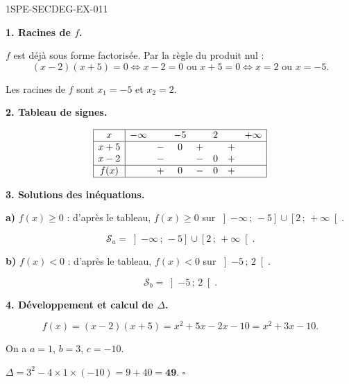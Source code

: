 \begin{corrige}{1SPE-SECDEG-EX-011}

\textbf{1. Racines de $f$.}


$f$ est déjà sous forme factorisée. Par la règle du produit nul :
\[(x-2)(x+5) = 0 \iff x - 2 = 0 \text{ ou } x + 5 = 0 \iff x = 2 \text{ ou } x = -5.\]

Les racines de $f$ sont $x_1 = -5$ et $x_2 = 2$.

\medskip
\textbf{2. Tableau de signes.}


\[
\begin{array}{|c|ccccccc|}
\hline
x & -\infty & & -5 & & 2 & & +\infty \\
\hline
x+5 & & - & 0 & + & & + & \\
x-2 & & - & & - & 0 & + & \\
\hline
f(x) & & + & 0 & - & 0 & + & \\
\hline
\end{array}
\]

\medskip
\textbf{3. Solutions des inéquations.}

\textbf{a)} $f(x) \geqslant 0$ : d'après le tableau, $f(x) \geqslant 0$ sur $\left]-\infty\,;\,-5\right] \cup \left[2\,;\,+\infty\right[$.

\[\boxed{\mathcal{S}_a = \left]-\infty\,;\,-5\right] \cup \left[2\,;\,+\infty\right[.}\]

\textbf{b)} $f(x) < 0$ : d'après le tableau, $f(x) < 0$ sur $\left]-5\,;\,2\right[$.

\[\boxed{\mathcal{S}_b = \left]-5\,;\,2\right[.}\]

\medskip
\textbf{4. Développement et calcul de $\Delta$.}


\[f(x) = (x-2)(x+5) = x^2 + 5x - 2x - 10 = x^2 + 3x - 10.\]

On a $a = 1$, $b = 3$, $c = -10$.

$\Delta = 3^2 - 4 \times 1 \times (-10) = 9 + 40 = \mathbf{49}$. \hfill $\square$

\end{corrige}
